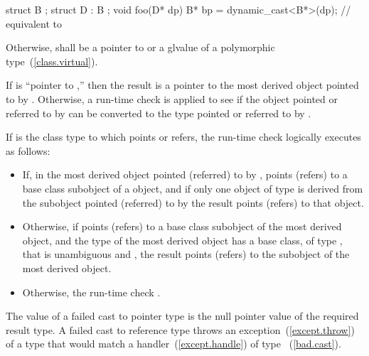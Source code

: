 \begin{codeblock}
struct B { };
struct D : B { };
void foo(D* dp) {
  B*  bp = dynamic_cast<B*>(dp);    // equivalent to 
}
\end{codeblock}
\exitexample 

\pnum
Otherwise,  shall be a pointer to or a glvalue of a polymorphic
type~(\ref{class.virtual}).

\pnum
If  is ``pointer to  ,'' then the result
is a pointer to the most derived object pointed to by .
Otherwise, a run-time check is applied to see if the object pointed or
referred to by  can be converted to the type pointed or
referred to by .

\pnum
If  is the class type to which  points or refers, the run-time
check logically executes as follows:

\begin{itemize}
\item If, in the most derived object pointed (referred) to by ,
 points (refers) to a  base class subobject of a
 object, and if only one object of type  is derived
from the subobject pointed (referred) to by  the result points (refers) to that  object.

\item Otherwise, if  points (refers) to a  base
class subobject of the most derived object, and the type of the most
derived object has a base class, of type , that is unambiguous
and , the result points (refers) to the
 subobject of the most derived object.

\item Otherwise, the
run-time check .
\end{itemize}

\pnum
The value of a failed cast to pointer type is the null pointer value of
the required result type. A failed cast to reference type throws
an exception~(\ref{except.throw}) of a type that would match a
handler~(\ref{except.handle}) of type ~(\ref{bad.cast}).

%
%
\enterexample 

